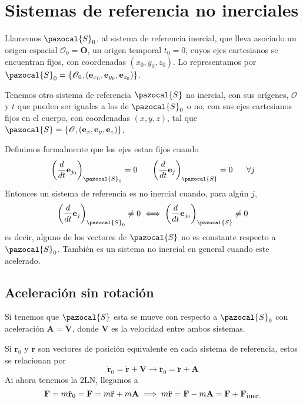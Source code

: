 
\chapter{Sistemas de referencia no inerciales} 
Llamemos $\pazocal{S}_0$, al sistema de referencia inercial, que lleva asociado un origen espacial $\mathcal{O}_0 = \mathbf{O}$, un origen temporal $t_0=0$, cuyos ejes cartesianos se encuentran fijos, con coordenadas $(x_0,y_0,z_0)$. Lo representamos por $\pazocal{S}_0 = \left\{\mathcal{O}_0,(\mathbf{e}_{x_0},\mathbf{e}_{y_0},\mathbf{e}_{z_0})\right\}$.

Tenemos otro sistema de referencia $\pazocal{S}$ no inercial, con sus orígenes, $\mathcal{O}$ y $t$ que pueden ser iguales a los de $\pazocal{S}_0$ o no, con sus ejes cartesianos fijos en el cuerpo, con coordenadas $(x,y,z)$, tal que $\pazocal{S} = \left\{\mathcal{O},(\mathbf{e}_x,\mathbf{e}_y,\mathbf{e}_z)\right\}$.

Definimos formalmente que los ejes estan fijos cuando 
\begin{equation} \label{6.1.1}
    \left(\frac{d}{dt}\mathbf{e}_{j_0}\right)_{\pazocal{S}_0} = 0 \ \ \ \ \ \left(\frac{d}{dt}\mathbf{e}_j\right)_{\pazocal{S}} = 0 \ \ \ \ \ \forall j
\end{equation} 
Entonces un sistema de referencia es no inercial cuando, para algún $j$,
\begin{equation} \label{6.1.1}
    \left(\frac{d}{dt}\mathbf{e}_j\right)_{\pazocal{S}_0} \neq 0 \iff \left(\frac{d}{dt}\mathbf{e}_{j_0}\right)_{\pazocal{S}} \neq 0 
\end{equation} 
es decir, alguno de los vectores de $\pazocal{S}$ no es constante respecto a $\pazocal{S}_0$. También es un sistema no inercial en general cuando este acelerado.
\section{Aceleración sin rotación}
Si tenemos que $\pazocal{S}$ esta se mueve con respecto a $\pazocal{S}_0$ con aceleración $\mathbf{A}=\dot{\mathbf{V}}$, donde $\mathbf{V}$ es la velocidad entre ambos sistemas.

Si $\mathbf{r}_0$ y $\mathbf{r}$ son vectores de posición equivalente en cada sistema de referencia, estos se relacionan por
\begin{equation} \label{6.1.1}
    \dot{\mathbf{r}}_0=\dot{\mathbf{r}}+\mathbf{V} \rightarrow \ddot{\mathbf{r}}_0=\ddot{\mathbf{r}}+\mathbf{A}
\end{equation} 
Ai ahora tenemos la 2LN, llegamos a 
\begin{equation} \label{6.1.1}
    \mathbf{F} = m\ddot{\mathbf{r}}_0 = \mathbf{F} = m\ddot{\mathbf{r}} + m \mathbf{A} \implies m\ddot{\mathbf{r}} = \mathbf{F}-m \mathbf{A} = \mathbf{F}+\mathbf{F}_{\mbox{\small iner.}}
\end{equation} 